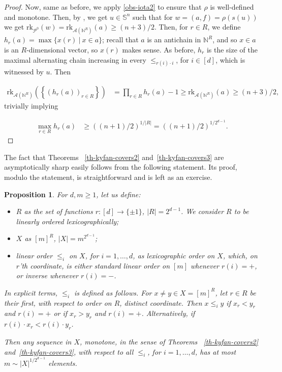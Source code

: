 \documentclass{article} %
\newcommand{\A}{\mathcal{A}}
\newcommand{\N}{\mathbb{N}}
\renewcommand{\SS}{\mathbb{S}}
\newcommand{\PP}{\mathcal{P}}
\newcommand{\rk}{\mathrm{rk}}
\newtheorem{proposition}{Proposition}
\begin{document}
\begin{proof}
	Now, same as before, we apply \eqref{obs-iota2} to ensure that $\rho$ is well-defined and monotone.  Then, by , we get $u\in \SS^n$ such that for $w = (a,f) = \rho(s(u))$ we get $\rk_{\PP^0}(w) = \rk_{\A(\N^R)}(a) \geq (n+3)/2$. Then, for $r\in R$,  we define $h_r(a) = \max \{x(r)~|~x\in a\}$; recall that $a$ is an antichain in $\N^R$, and so $x\in a$ is an $R$-dimensional vector, so $x(r)$ makes sense. As before, $h_r$ is the size of the maximal alternating chain increasing in every $\leq_{r(i)\cdot i}$, for $i\in [d]$, which is witnessed by $u$. Then 
	 
	 \begin{align*}
	 	\rk_{\A(\N^R)} \left( \left\{ \left(h_r(a) \right)_{r\in R} \right\} \right)
	 		&= \prod_{r\in R} h_r(a) - 1 \geq  \rk_{\A(\N^R)}(a)
	 			\geq (n+3)/2,
	 \end{align*}
	 trivially implying 

	 \begin{align*}
	 		\max_{r\in R} h_r(a) &\geq \left((n+1)/2\right)^{1/|R|}
	 			= \left((n+1)/2\right)^{1/2^{d-1}}.
	 \end{align*}
\end{proof}

The fact that Theorems ~\ref{th-kyfan-covers2} and~\ref{th-kyfan-covers3} are asymptotically sharp easily follows from the following statement. Its proof, modulo the statement, is straightforward and is left as an exercise.
\begin{proposition}\label{prop-d-orders}
	For $d, m\geq 1$, let us define:
	\begin{itemize} 
		\item $R$ as the set of functions $r\colon [d]\rightarrow \{\pm1\}$, $|R| = 2^{d-1}$. We consider $R$ to be linearly ordered lexicographically;
		\item $X$ as $[m]^R$, $|X| = m^{2^{d-1}}$;
		\item linear order $\leq_i$ on $X$, for $i=1, \dots, d$, as lexicographic order on $X$, which, on $r$'th coordinate, is either standard linear order on $[m]$ whenever $r(i) = +$, or inverse whenever $r(i) = -$.
	\end{itemize}	
	
	In explicit terms, $\leq_i$ is defined as follows. For $x\neq y \in X = [m]^{R}$, let $r \in R$ be their first, with respect to order on $R$, distinct coordinate. Then $x\leq_i y$ if $x_r < y_r$ and $r(i) = +$ or if $x_r > y_r$ and $r(i) = +$. Alternatively, if $r(i) \cdot x_r < r(i) \cdot y_r$.
	
	Then any sequence in $X$, monotone, in the sense of Theorems ~\ref{th-kyfan-covers2} and~\ref{th-kyfan-covers3}, with respect to all $\leq_i$, for $i=1, \dots, d$, has at most $m \sim |X|^{1/2^{d-1}}$ elements.
\end{proposition}



\end{document}
